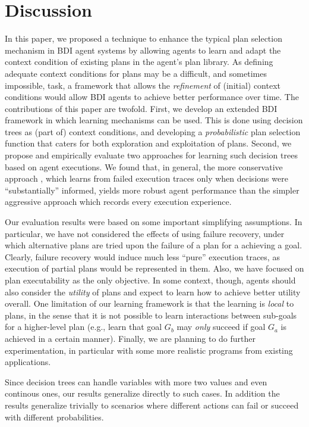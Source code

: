 \section{Discussion}\label{sec:discussion}

In this paper, we proposed a technique to enhance the typical plan selection mechanism
in BDI agent systems by allowing agents to learn and adapt the context condition of existing plans
in the agent's plan library.
%
As defining adequate context conditions for plans may be a difficult, and
sometimes 
impossible, task, a framework that allows the \emph{refinement} of (initial) context
conditions would allow BDI agents to achieve better performance over time.
%
The contributions of this paper are twofold. First, we develop an extended BDI framework in which
learning mechanisms can be used. This is done using decision trees as (part of) context
conditions, and developing a \textit{probabilistic} plan selection function that caters for both
exploration and exploitation of plans. Second, we propose and empirically evaluate two approaches
for learning such decision trees based on agent executions. We found that, in general, the more
conservative approach \BUL, which learns from failed execution traces only when decisions were
``substantially'' informed, yields more robust agent performance than the simpler aggressive
approach \CL which records every execution experience.


Our evaluation results were based on some important simplifying assumptions. In particular,
we have not considered the effects of using failure recovery, under which alternative plans are
tried upon the failure of a plan for a achieving a goal. Clearly, failure recovery would induce much
less ``pure'' execution traces, as execution of partial plans would be represented in them. Also,
we have focused on plan executability as the only objective. In some context, though, agents 
should also consider the \textit{utility} of plans and expect to learn how to achieve better utility
overall.
%
One limitation of our learning framework is that the learning is \emph{local} to plans, in the
sense that it is not possible to learn interactions between sub-goals for a higher-level plan (e.g.,
learn that goal $G_b$ may \textit{only} succeed if goal $G_a$ is achieved in a certain manner).
%
Finally, we are planning to do further experimentation, in particular with some more realistic
programs from existing applications. 



\bigskip\bigskip\bigskip

Since decision trees can handle variables with more two values and
even continous ones, our results generalize directly to such cases. In addition
the results generalize trivially to scenarios where different actions can fail
or succeed with different probabilities.